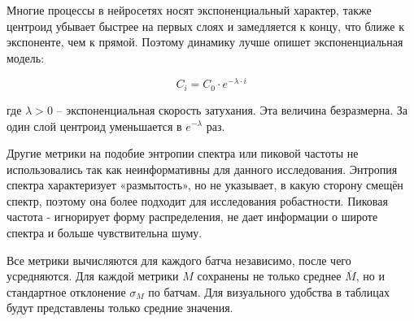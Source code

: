 Многие процессы в нейросетях носят экспоненциальный характер, также центроид убывает быстрее на первых слоях и замедляется к концу, что ближе к экспоненте, чем к прямой. Поэтому динамику лучше опишет экспоненциальная модель:

\begin{equation}
    C_{i}=C_{0} \cdot e^{-\lambda \cdot i}
\end{equation}

где $\lambda>0$ – экспоненциальная скорость затухания. Эта величина безразмерна. За один слой центроид уменьшается в $e^{-\lambda} $ раз. 

Другие метрики на подобие энтропии спектра или пиковой частоты не использовались так как неинформативны для данного исследования. Энтропия спектра характеризует «размытость», но не указывает, в какую сторону смещён спектр, поэтому она более подходит для исследования робастности. Пиковая частота - игнорирует форму распределения, не дает информации о широте спектра и больше чувствительна шуму.

Все метрики вычисляются для каждого батча независимо, после чего усредняются. Для каждой метрики $M$ сохранены не только среднее $\overline{M}$, но и стандартное отклонение $\sigma_M$ по батчам. Для визуального удобства в таблицах будут представлены только средние значения. 